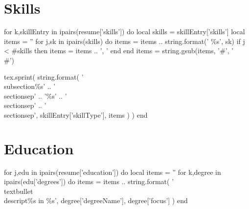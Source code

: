\documentclass[]{plushcv}
\begin{document}
\begin{minipage}[t]{0.25\textwidth}



\section{Skills}
\sectionsep

\begin{luacode}

  for k,skillEntry in ipairs(resume['skills']) do
    local skills = skillEntry['skills']
    local items = ''
    for j,sk in ipairs(skills) do
      items = items .. string.format(' \%s', sk)
      if j < #skills then
	items = items .. ',  '
      end
    end
    items = string.gsub(items, '\#', '\\\#')

    tex.sprint(
      string.format(
	'\\subsection{\%s}' ..
	'\\sectionsep' ..
	'\%s' ..
	'\\sectionsep' ..
	'\\sectionsep',
	skillEntry['skillType'],
	items
      )
    )
  end

\end{luacode}




\section{Education}
\begin{luacode}
  for j,edu in ipairs(resume['education']) do
    local items = ''
    for k,degree in ipairs(edu['degrees']) do
      items = items .. string.format(
	'\\textbullet{}\\descript{\%s in \%s}',
	degree['degreeName'],
	degree['focus']
      )
    end


\end{luacode}
\end{minipage}
\end{document}
